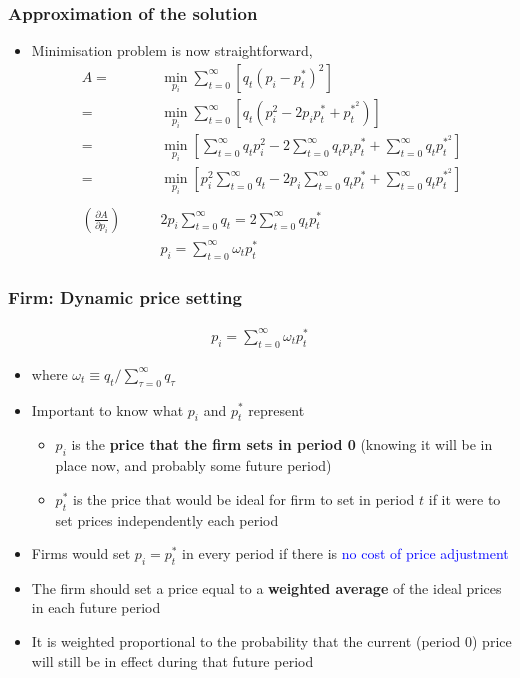 \documentclass[10pt, xcolor=x11names, table]{beamer}
\begin{document}
\begin{frame}
\frametitle{Approximation of the solution}
\small
\begin{itemize}
\item Minimisation problem is now straightforward,
\begin{align*}
A = &\min_{p_{i}} \sum_{t=0}^{\infty}\left[q_{t}(p_{i} - p_{t}^{*})^{2}\right] \\
 = &\min_{p_{i}} \sum_{t=0}^{\infty}\left[q_{t}(p_{i}^{2} - 2{p_{i}}p_{t}^{*} + p_{t}^{*^2})\right] \\
 = &\min_{p_{i}} \left[\sum_{t=0}^{\infty}q_{t}p_{i}^{2} - 2\sum_{t=0}^{\infty}q_{t}{p_{i}}p_{t}^{*} + \sum_{t=0}^{\infty}q_{t}p_{t}^{*^2}\right] \\
 = &\min_{p_{i}} \left[p_{i}^{2}\sum_{t=0}^{\infty}q_{t} - 2{p_{i}}\sum_{t=0}^{\infty}q_{t}p_{t}^{*} + \sum_{t=0}^{\infty}q_{t}p_{t}^{*^2}\right] \\~\\
\left(\frac{\partial{A}}{\partial{p_{i}}}\right) \qquad &2p_{i}\sum_{t=0}^{\infty}q_{t} = 2\sum_{t=0}^{\infty}q_{t}p_{t}^{*} \\
&p_{i} = \sum_{t=0}^{\infty}\omega_{t}p^{*}_{t}
\end{align*}
\end{itemize}
\end{frame}


\begin{frame}
\frametitle{Firm: Dynamic price setting}
\begin{align*}
p_{i} = \sum_{t=0}^{\infty}\omega_{t}p^{*}_{t}
\end{align*}
\begin{itemize}
\item where $\textstyle \omega_{t} \equiv q_{t}/\sum_{\tau=0}^{\infty}q_{\tau}$
\item Important to know what $p_{i}$ and $p^{*}_{t}$ represent
\begin{itemize}
  \item $p_{i}$ is the \textbf{price that the firm sets in period 0} (knowing it will be in place now, and probably some future period)
  \item $p_{t}^{*}$ is the price that would be ideal for firm to set in period $t$ if it were to set prices independently each period
\end{itemize}
\item Firms would set $p_{i} = p^{*}_{t}$ in every period if there is \textcolor{blue}{no cost of price adjustment}
\item The firm should set a price equal to a \textbf{weighted average} of the ideal prices in each future period
\item It is weighted proportional to the probability that the current (period 0) price will still be in effect during that future period
\end{itemize}
\end{frame}
\end{document}
